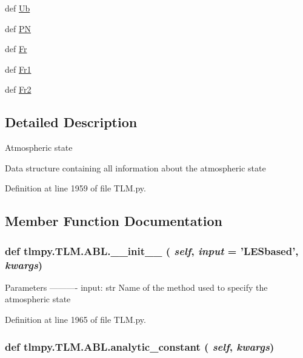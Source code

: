 \begin{DoxyCompactItemize}
\item 
def \hyperlink{classtlmpy_1_1TLM_1_1ABL_ac55773fc791cd9d7cc920e22d4043623}{Ub}
\item 
def \hyperlink{classtlmpy_1_1TLM_1_1ABL_a81cb0928b83866d15295a6f570fa673c}{PN}
\item 
def \hyperlink{classtlmpy_1_1TLM_1_1ABL_a354243a0d0091ff69f0680832d172fb3}{Fr}
\item 
def \hyperlink{classtlmpy_1_1TLM_1_1ABL_aa9e515fedf7e342f623ab9da063f39c7}{Fr1}
\item 
def \hyperlink{classtlmpy_1_1TLM_1_1ABL_ad8e1be8faa2dc3d8d7bd77e04b9a57bb}{Fr2}
\end{DoxyCompactItemize}


\subsection{Detailed Description}
\begin{DoxyVerb}
Atmospheric state

Data structure containing all information about the atmospheric state
\end{DoxyVerb}
 

Definition at line 1959 of file TLM.py.

\subsection{Member Function Documentation}
\hypertarget{classtlmpy_1_1TLM_1_1ABL_a8ae8708716d331035614115aad416139}{
\subsubsection[{\_\-\_\-init\_\-\_\-}]{\setlength{\rightskip}{0pt plus 5cm}def tlmpy.TLM.ABL.\_\-\_\-init\_\-\_\- ( {\em self}, \/   {\em input} = {\ttfamily 'LESbased'}, \/   {\em kwargs})}}
\label{classtlmpy_1_1TLM_1_1ABL_a8ae8708716d331035614115aad416139}
\begin{DoxyVerb}
Parameters
----------
input: str
    Name of the method used to specify the atmospheric state
\end{DoxyVerb}
 

Definition at line 1965 of file TLM.py.\hypertarget{classtlmpy_1_1TLM_1_1ABL_ad5a2d4bc169fc2d3c1d9bcd0db0abf2b}{
\subsubsection[{analytic\_\-constant}]{\setlength{\rightskip}{0pt plus 5cm}def tlmpy.TLM.ABL.analytic\_\-constant ( {\em self}, \/   {\em kwargs})}}
\label{classtlmpy_1_1TLM_1_1ABL_ad5a2d4bc169fc2d3c1d9bcd0db0abf2b}


